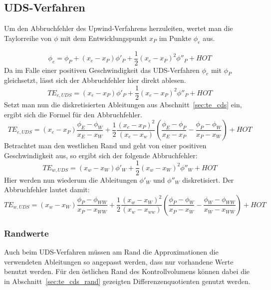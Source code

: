 \subsection{UDS-Verfahren}

Um den Abbruchfehler des Upwind-Verfahrens herzuleiten, wertet man die
Taylorreihe von $\phi$ mit dem Entwicklungspunkt $x_P$ im Punkte $\phi_e$
aus.

\begin{equation*}
  \phi_e = \phi_P +(x_e-x_P) \phi'_P + \frac{1}{2} (x_e-x_P)^2 \phi''_P+HOT
\end{equation*}
Da im Falle einer positiven Geschwindigkeit das UDS-Verfahren $\phi_e$ mit $\phi_P$
gleichsetzt, lässt sich der Abbruchfehler hier direkt ablesen.
\begin{equation*}
  TE_{e, UDS} = (x_e-x_P) \phi'_P + \frac{1}{2} (x_e-x_P)^2 \phi''_P+HOT
\end{equation*}
Setzt man nun die diskretisierten Ableitungen aus Abschnitt~\ref{sec:te_cds} ein,
ergibt sich die Formel für den Abbruchfehler.
\begin{equation}
  TE_{e, UDS} = (x_e-x_P) \frac{\phi_E-\phi_W}{x_E-x_W}+
  \frac{1}{2} \frac{(x_e-x_P)^2}{(x_e-x_w)} \left({\frac{\phi_E-\phi_P}{x_E-x_P}
  - \frac{\phi_P-\phi_W}{x_P-x_W} }\right)+HOT
\end{equation}
Betrachtet man den westlichen Rand und geht von einer positiven Geschwindigkeit aus,
so ergibt sich der folgende Abbruchfehler:
\begin{equation*}
  TE_{w, UDS} = (x_w-x_W) \phi'_W + \frac{1}{2} (x_w-x_W)^2 \phi''_W + HOT
\end{equation*}
Hier werden nun wiederum die Ableitungen $\phi'_W$ und $\phi''_W$ diskretisiert. Der
Abbruchfehler lautet damit:
\begin{equation}
  TE_{w, UDS} = (x_w-x_W) \frac{\phi_P-\phi_{WW}}{x_P-x_{WW}}+
  \frac{1}{2} \frac{(x_w-x_W)^2}{(x_w-x_{ww})} \left({\frac{\phi_P-\phi_W}{x_P-x_W}
  - \frac{\phi_W-\phi_{WW}}{x_W-x_{WW}} }\right)+HOT
\end{equation}



\subsubsection{Randwerte}

Auch beim UDS-Verfahren müssen am Rand die Approximationen die verwendeten Ableitungen
so angepasst werden, dass nur vorhandene Werte benutzt werden.
Für den östlichen Rand des Kontrollvolumens können dabei die in Abschnitt~\ref{sec:te_cds_rand}
gezeigten Differenzenquotienten genutzt werden.

